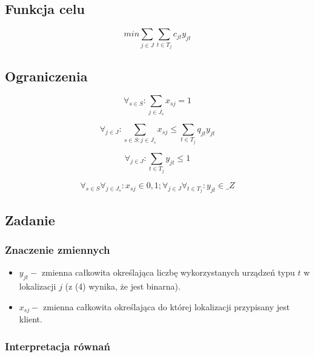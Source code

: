 \documentclass{article}
\begin{document}
\subsection{Funkcja celu}

\begin{equation}
min \sum_{j \in J} \sum_{t \in T_j} c_{jt}y_{jt}
\end{equation}

\subsection{Ograniczenia}

\begin{equation}
  \forall_{s \in {S}} : \sum_{j \in J_s} x_{sj} = 1
\end{equation}

\begin{equation}
  \forall_{j \in J} : \sum_{s \in S : j \in J_s } x_{sj} \leq \sum_{t \in T_j} q_{jt}y_{jt}
\end{equation}

\begin{equation}
  \forall_{j \in J} : \sum_{t \in T_j} y_{jt} \leq 1
\end{equation}

\begin{equation*}
  \forall_{s \in S} \forall_{j \in J_s} : x_{sj} \in {0,1}; \forall_{j \in J} \forall_{t \in T_j}: y_{jt} \in \mathbb_{Z}
\end{equation*}

\subsection{Zadanie}

\subsubsection{Znaczenie zmiennych}

\begin{itemize}
  \item $y_{jt} - $ zmienna całkowita określająca liczbę wykorzystanych urządzeń typu $t$ w lokalizacji $j$ (z (4) wynika, że jest binarna).
  \item $x_{sj} - $ zmienna całkowita określająca do której lokalizacji przypisany jest klient.
\end{itemize}

\subsubsection{Interpretacja równań}
\end{document}
